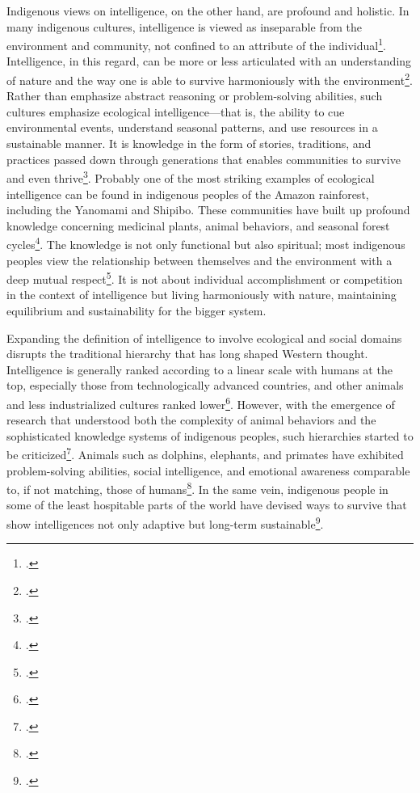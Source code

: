 \documentclass[12pt]{article}
\begin{document}
Indigenous views on intelligence, on the other hand, are profound and holistic. In many indigenous cultures, intelligence is viewed as inseparable from the environment and community, not confined to an attribute of the individual\footcite{berkes2012sacred}. Intelligence, in this regard, can be more or less articulated with an understanding of nature and the way one is able to survive harmoniously with the environment\footcite{berkes2012sacred}. Rather than emphasize abstract reasoning or problem-solving abilities, such cultures emphasize ecological intelligence—that is, the ability to cue environmental events, understand seasonal patterns, and use resources in a sustainable manner. It is knowledge in the form of stories, traditions, and practices passed down through generations that enables communities to survive and even thrive\footcite{berkes2012sacred}. Probably one of the most striking examples of ecological intelligence can be found in indigenous peoples of the Amazon rainforest, including the Yanomami and Shipibo. These communities have built up profound knowledge concerning medicinal plants, animal behaviors, and seasonal forest cycles\footcite{berkes2012sacred}. The knowledge is not only functional but also spiritual; most indigenous peoples view the relationship between themselves and the environment with a deep mutual respect\footcite{berkes2012sacred}. It is not about individual accomplishment or competition in the context of intelligence but living harmoniously with nature, maintaining equilibrium and sustainability for the bigger system.

Expanding the definition of intelligence to involve ecological and social domains disrupts the traditional hierarchy that has long shaped Western thought. Intelligence is generally ranked according to a linear scale with humans at the top, especially those from technologically advanced countries, and other animals and less industrialized cultures ranked lower\footcite{nisbett2003geography}. However, with the emergence of research that understood both the complexity of animal behaviors and the sophisticated knowledge systems of indigenous peoples, such hierarchies started to be criticized\footcite{dewaal2016are}. Animals such as dolphins, elephants, and primates have exhibited problem-solving abilities, social intelligence, and emotional awareness comparable to, if not matching, those of humans\footcite{dewaal2016are}. In the same vein, indigenous people in some of the least hospitable parts of the world have devised ways to survive that show intelligences not only adaptive but long-term sustainable\footcite{berkes2012sacred}.
\end{document}
